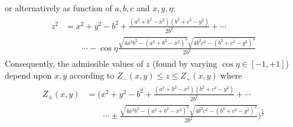 \documentclass[notitlepage]{article}
\begin{document}
or alternatively as function of $a,b,c$ and $x,y,\eta$:
\begin{align}
    \begin{split}
        z^2
        &= x^2 + y^2 - b^2 + \frac{(a^2+b^2-x^2)(b^2+c^2-y^2)}{2b^2} + \cdots \\
        &\qquad \cdots - \cos \eta \frac{\sqrt{4a^2b^2-(a^2+b^2-x^2)^2}\sqrt{4b^2c^2-(b^2+c^2-y^2)^2}}{2b^2}
    \end{split}
\end{align}
Consequently, the admissible values of $z$ (found by varying $\cos \eta \in [-1, +1]$) depend upon $x,y$ according to $Z_{-}(x,y) \leq z \leq Z_{+}(x,y)$ where
\begin{align}
    \begin{split}
        Z_{\pm}(x,y) 
        &= \bigg(x^2 + y^2 - b^2 + \frac{(a^2+b^2-x^2)(b^2+c^2-y^2)}{2b^2} +\cdots\\&\qquad\cdots\pm \frac{\sqrt{4a^2b^2-(a^2+b^2-x^2)^2}\sqrt{4b^2c^2-(b^2+c^2-y^2)^2}}{2b^2}\bigg)^{\frac{1}{2}}
    \end{split}
\end{align}
\end{document}
